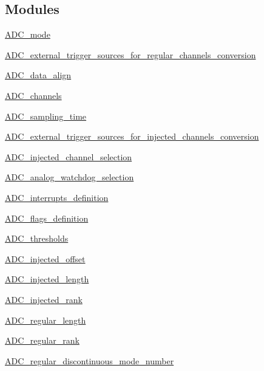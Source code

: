 \subsection*{Modules}
\begin{DoxyCompactItemize}
\item 
\hyperlink{group___a_d_c__mode}{A\+D\+C\+\_\+mode}
\item 
\hyperlink{group___a_d_c__external__trigger__sources__for__regular__channels__conversion}{A\+D\+C\+\_\+external\+\_\+trigger\+\_\+sources\+\_\+for\+\_\+regular\+\_\+channels\+\_\+conversion}
\item 
\hyperlink{group___a_d_c__data__align}{A\+D\+C\+\_\+data\+\_\+align}
\item 
\hyperlink{group___a_d_c__channels}{A\+D\+C\+\_\+channels}
\item 
\hyperlink{group___a_d_c__sampling__time}{A\+D\+C\+\_\+sampling\+\_\+time}
\item 
\hyperlink{group___a_d_c__external__trigger__sources__for__injected__channels__conversion}{A\+D\+C\+\_\+external\+\_\+trigger\+\_\+sources\+\_\+for\+\_\+injected\+\_\+channels\+\_\+conversion}
\item 
\hyperlink{group___a_d_c__injected__channel__selection}{A\+D\+C\+\_\+injected\+\_\+channel\+\_\+selection}
\item 
\hyperlink{group___a_d_c__analog__watchdog__selection}{A\+D\+C\+\_\+analog\+\_\+watchdog\+\_\+selection}
\item 
\hyperlink{group___a_d_c__interrupts__definition}{A\+D\+C\+\_\+interrupts\+\_\+definition}
\item 
\hyperlink{group___a_d_c__flags__definition}{A\+D\+C\+\_\+flags\+\_\+definition}
\item 
\hyperlink{group___a_d_c__thresholds}{A\+D\+C\+\_\+thresholds}
\item 
\hyperlink{group___a_d_c__injected__offset}{A\+D\+C\+\_\+injected\+\_\+offset}
\item 
\hyperlink{group___a_d_c__injected__length}{A\+D\+C\+\_\+injected\+\_\+length}
\item 
\hyperlink{group___a_d_c__injected__rank}{A\+D\+C\+\_\+injected\+\_\+rank}
\item 
\hyperlink{group___a_d_c__regular__length}{A\+D\+C\+\_\+regular\+\_\+length}
\item 
\hyperlink{group___a_d_c__regular__rank}{A\+D\+C\+\_\+regular\+\_\+rank}
\item 
\hyperlink{group___a_d_c__regular__discontinuous__mode__number}{A\+D\+C\+\_\+regular\+\_\+discontinuous\+\_\+mode\+\_\+number}
\end{DoxyCompactItemize}
